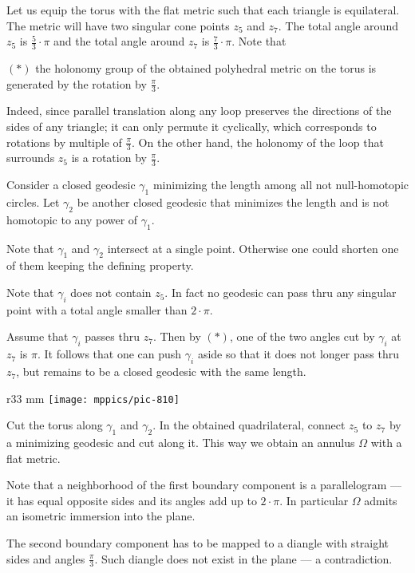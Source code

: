 Let us equip the torus with the flat metric such that each triangle is equilateral.
The metric will have two singular cone points $z_5$ and $z_7$.
The total angle around $z_5$ is $\tfrac53\cdot\pi$
and the total angle around $z_7$ is $\tfrac73\cdot\pi$.
Note that

\begin{cl}{$({*})$}
the holonomy group of the obtained polyhedral metric on the torus is generated by the rotation by $\tfrac\pi3$.
\end{cl}

Indeed, since parallel translation along any loop preserves the directions of the sides of any triangle;
it can only permute it cyclically, which corresponds to rotations by multiple of $\tfrac\pi3$. 
On the other hand, the holonomy of the loop that surrounds $z_5$ is a rotation by $\tfrac\pi3$.

Consider a closed geodesic $\gamma_1$ minimizing the length among all not null-homotopic circles.
Let $\gamma_2$ be another closed geodesic that minimizes the length and is not homotopic to any power of $\gamma_1$.

Note that $\gamma_1$ and $\gamma_2$ intersect at a single point.
Otherwise one could shorten one of them keeping the defining property.

Note that $\gamma_i$ does not contain $z_5$.
In fact no geodesic can pass thru any singular point with a total angle smaller than $2\cdot\pi$.

Assume that $\gamma_i$ passes thru $z_7$.
Then by $({*})$, one of the two angles cut by $\gamma_i$ at $z_7$ is $\pi$.
It follows that one can push $\gamma_i$ aside so that it does not longer pass thru $z_7$, but remains to be a closed geodesic with the same length.

\begin{wrapfigure}{r}{33 mm}
\vskip0mm
\centering
\texttt{[image: mppics/pic-810]}
\end{wrapfigure}

Cut the torus along $\gamma_1$ and $\gamma_2$.
In the obtained quadrilateral, connect $z_5$ to $z_7$ by a minimizing geodesic and cut along it.
This way we obtain an annulus $\Omega$ with a flat metric.

Note that a neighborhood of the first boundary component is a parallelogram --- it has equal opposite sides and its angles add up to $2\cdot \pi$.
In particular $\Omega$ admits an isometric immersion into the plane.

The second boundary component has to be mapped to a diangle with straight sides and angles $\tfrac\pi3$.
Such diangle does not exist in the plane --- a contradiction.
\qeds

